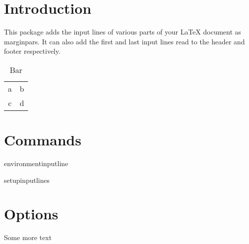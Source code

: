 \documentclass{scrartcl}
\begin{document}
\pretocmd{\caption}{\addlineno}{}{}
\section{Introduction}
This package adds the input lines of various parts of your LaTeX
document as marginpars.
It can also add the first and last input lines read to the header and
footer respectively.

\begin{table}
  \centering
  \begin{tabular}{cc}
    a & b\\
    c&d
  \end{tabular}
  \caption{Bar}
\end{table}

\section{Commands}

environmentinputline

setupinputlines

\section{Options}
Some more text
\end{document}
